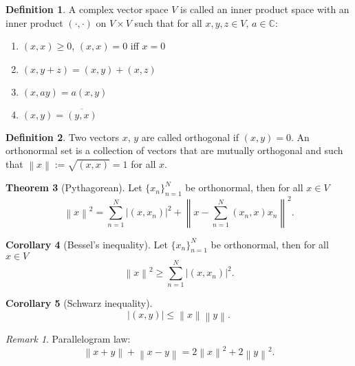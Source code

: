 \documentclass[twocolumn]{article}
\theoremstyle{definition}
\newtheorem{definition}{Definition}[section]
\newtheorem{theorem}[definition]{Theorem}
\newtheorem{corollary}[definition]{Corollary}
\theoremstyle{remark}
\newtheorem*{remark}{Remark}
\begin{document}
\begin{definition}
    A complex vector space $V$ is called an inner product space with an inner product
    $(\cdot, \cdot)$ on $V \times V$ such that for all $x, y, z \in V,\, a \in \mathbb{C}$:
    \begin{enumerate}[noitemsep]
        \item $(x, x) \geq 0$, $(x, x) = 0$ iff $x = 0$
        \item $(x, y + z) = (x, y) + (x, z)$
        \item $(x, ay) = a(x, y)$
        \item $(x, y) = \overline{(y, x)}$
    \end{enumerate}
\end{definition}
\begin{definition}
    Two vectors $x$, $y$ are called orthogonal if $(x, y) = 0$. An orthonormal set is a collection
    of vectors that are mutually orthogonal and such that $\left\lVert x \right\rVert := \sqrt{(x, x)} = 1$ for all $x$.
\end{definition}
\begin{theorem}[Pythagorean]
    Let $\{x_n \}_{n=1}^N$ be orthonormal, then for all $x \in V$
    \begin{equation}
        \left\lVert x\right\rVert^2 = \sum_{n=1}^N \left\lvert (x, x_n)\right\rvert^2 + \left\lVert x - \sum_{n=1}^N (x_n, x)x_n\right\rVert^2.
    \end{equation}
\end{theorem}
\begin{corollary}[Bessel's inequality]
    Let $\{x_n \}_{n=1}^N$ be orthonormal, then for all $x \in V$
    \begin{equation}
        \left\lVert x\right\rVert^2 \geq \sum_{n=1}^N \left\lvert (x, x_n)\right\rvert^2.
    \end{equation}
\end{corollary}
\begin{corollary}[Schwarz inequality]
    \begin{equation}
        \left\lvert (x, y)\right\rvert \leq \left\lVert x\right\rVert \left\lVert y\right\rVert.
    \end{equation}
\end{corollary}
\begin{remark}
    Parallelogram law:
    \begin{equation}
        \left\lVert x + y\right\rVert + \left\lVert x - y\right\rVert = 2 \left\lVert x\right\rVert ^2 + 2 \left\lVert y\right\rVert ^2.
    \end{equation}
\end{remark}
\end{document}
